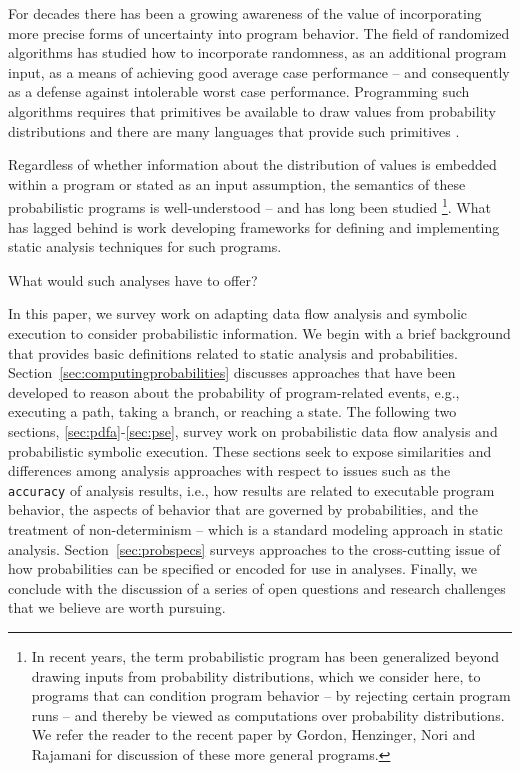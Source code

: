 For decades there has been a growing awareness of the value of 
incorporating more precise forms of uncertainty into program behavior.  
The field of randomized algorithms has studied how to incorporate
randomness, as an additional program input, as a means of achieving
good average case performance -- and consequently as a defense against
intolerable worst case performance.
Programming such algorithms requires that primitives be available
to draw values from probability distributions and there are many
languages that provide such primitives \cite{NetLogo,others}.  

Regardless of whether information about the distribution of
values is embedded within a program or stated as an input assumption,
the semantics of these probabilistic programs is well-understood --
and has long been studied \cite{kozen1981semantics,others}
\footnote{In recent
years, the term probabilistic program has been generalized beyond
drawing inputs from probability distributions, which we
consider here, to programs that can condition program behavior -- by
rejecting certain program runs -- and thereby be viewed as
computations over probability distributions.  We refer the reader to the
recent paper by Gordon, Henzinger, Nori and Rajamani \cite{Gordon2014}
for discussion of these more general programs.}. 
What has lagged behind is work developing frameworks for 
defining and implementing static analysis techniques for such programs.

What would such analyses have to offer?

In this paper, we survey work on adapting data flow analysis 
and symbolic execution to consider probabilistic information.
We begin with a brief background that provides basic definitions
related to static analysis and probabilities.
Section~\ref{sec:computingprobabilities} discusses approaches that
have been developed to reason about the probability of program-related 
events, e.g., executing a path, taking a branch, or reaching a state.
The following two sections, \ref{sec:pdfa}-\ref{sec:pse}, 
survey work on probabilistic data flow analysis and probabilistic
symbolic execution.  These sections seek to expose similarities
and differences among analysis approaches with respect to issues
such as the \texttt{accuracy} of analysis results, i.e., how results
are related to executable program behavior, 
the aspects of behavior that are governed by probabilities, and
the treatment of non-determinism -- which is a standard modeling
approach in static analysis.
Section~\ref{sec:probspecs} surveys approaches to the cross-cutting
issue of how probabilities can be specified or encoded for use
in analyses.
Finally, we conclude with the discussion of a series of open questions
and research challenges that we believe are worth pursuing.

